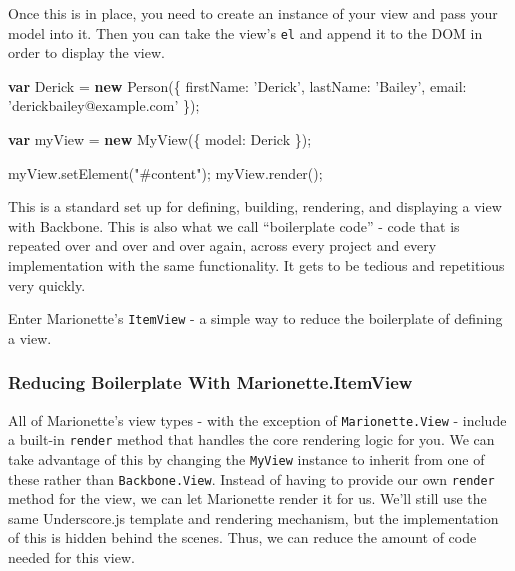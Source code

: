 \documentclass[9pt]{book}
\newenvironment{Shaded}{}{}
\newcommand{\KeywordTok}[1]{\textcolor[rgb]{0.00,0.44,0.13}{\textbf{{#1}}}}
\newcommand{\DataTypeTok}[1]{\textcolor[rgb]{0.56,0.13,0.00}{{#1}}}
\newcommand{\StringTok}[1]{\textcolor[rgb]{0.25,0.44,0.63}{{#1}}}
\newcommand{\OtherTok}[1]{\textcolor[rgb]{0.00,0.44,0.13}{{#1}}}
\newcommand{\FunctionTok}[1]{\textcolor[rgb]{0.02,0.16,0.49}{{#1}}}
\newcommand{\NormalTok}[1]{{#1}}
\begin{document}
Once this is in place, you need to create an instance of your view and
pass your model into it. Then you can take the view's \texttt{el} and
append it to the DOM in order to display the view.

\begin{Shaded}
\begin{Highlighting}[]
\KeywordTok{var} \NormalTok{Derick = }\KeywordTok{new} \FunctionTok{Person}\NormalTok{(\{}
  \DataTypeTok{firstName}\NormalTok{: }\StringTok{'Derick'}\NormalTok{,}
  \DataTypeTok{lastName}\NormalTok{: }\StringTok{'Bailey'}\NormalTok{,}
  \DataTypeTok{email}\NormalTok{: }\StringTok{'derickbailey@example.com'}
\NormalTok{\});}

\KeywordTok{var} \NormalTok{myView = }\KeywordTok{new} \FunctionTok{MyView}\NormalTok{(\{}
  \DataTypeTok{model}\NormalTok{: Derick}
\NormalTok{\});}

\OtherTok{myView}\NormalTok{.}\FunctionTok{setElement}\NormalTok{(}\StringTok{"#content"}\NormalTok{);}
\OtherTok{myView}\NormalTok{.}\FunctionTok{render}\NormalTok{();}
\end{Highlighting}
\end{Shaded}

This is a standard set up for defining, building, rendering, and
displaying a view with Backbone. This is also what we call ``boilerplate
code'' - code that is repeated over and over and over again, across
every project and every implementation with the same functionality. It
gets to be tedious and repetitious very quickly.

Enter Marionette's \texttt{ItemView} - a simple way to reduce the
boilerplate of defining a view.

\subsubsection{Reducing Boilerplate With
Marionette.ItemView}\label{reducing-boilerplate-with-marionette.itemview}

All of Marionette's view types - with the exception of
\texttt{Marionette.View} - include a built-in \texttt{render} method
that handles the core rendering logic for you. We can take advantage of
this by changing the \texttt{MyView} instance to inherit from one of
these rather than \texttt{Backbone.View}. Instead of having to provide
our own \texttt{render} method for the view, we can let Marionette
render it for us. We'll still use the same Underscore.js template and
rendering mechanism, but the implementation of this is hidden behind the
scenes. Thus, we can reduce the amount of code needed for this view.
\end{document}
